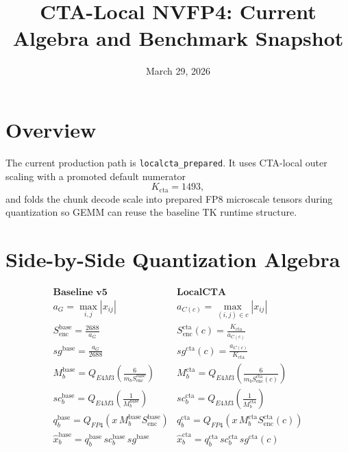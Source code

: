 \documentclass[11pt]{article}
\title{CTA-Local NVFP4: Current Algebra and Benchmark Snapshot}
\author{}
\date{March 29, 2026}
\begin{document}
\maketitle

\section{Overview}

The current production path is \texttt{localcta\_prepared}. It uses CTA-local outer scaling with a promoted default numerator
\[
K_{\mathrm{cta}} = 1493,
\]
and folds the chunk decode scale into prepared FP8 microscale tensors during quantization so GEMM can reuse the baseline TK runtime structure.

\section{Side-by-Side Quantization Algebra}

\[
\renewcommand{\arraystretch}{1.5}
\begin{array}{c|c}
\textbf{Baseline v5} & \textbf{LocalCTA} \\
\hline
a_G = \max\limits_{i,j} |x_{ij}| &
a_{C(c)} = \max\limits_{(i,j)\in c} |x_{ij}| \\

S_{\mathrm{enc}}^{\mathrm{base}} = \frac{2688}{a_G} &
S_{\mathrm{enc}}^{\mathrm{cta}}(c) = \frac{K_{\mathrm{cta}}}{a_{C(c)}} \\

sg^{\mathrm{base}} = \frac{a_G}{2688} &
sg^{\mathrm{cta}}(c) = \frac{a_{C(c)}}{K_{\mathrm{cta}}} \\

M_b^{\mathrm{base}} = Q_{E4M3}\!\left(\frac{6}{m_b S_{\mathrm{enc}}^{\mathrm{base}}}\right) &
M_b^{\mathrm{cta}} = Q_{E4M3}\!\left(\frac{6}{m_b S_{\mathrm{enc}}^{\mathrm{cta}}(c)}\right) \\

sc_b^{\mathrm{base}} = Q_{E4M3}\!\left(\frac{1}{M_b^{\mathrm{base}}}\right) &
sc_b^{\mathrm{cta}} = Q_{E4M3}\!\left(\frac{1}{M_b^{\mathrm{cta}}}\right) \\

q_b^{\mathrm{base}} = Q_{FP4}\!\left(x \, M_b^{\mathrm{base}} S_{\mathrm{enc}}^{\mathrm{base}}\right) &
q_b^{\mathrm{cta}} = Q_{FP4}\!\left(x \, M_b^{\mathrm{cta}} S_{\mathrm{enc}}^{\mathrm{cta}}(c)\right) \\

\hat{x}_b^{\mathrm{base}} = q_b^{\mathrm{base}} \, sc_b^{\mathrm{base}} \, sg^{\mathrm{base}} &
\hat{x}_b^{\mathrm{cta}} = q_b^{\mathrm{cta}} \, sc_b^{\mathrm{cta}} \, sg^{\mathrm{cta}}(c)
\end{array}
\]
\end{document}
